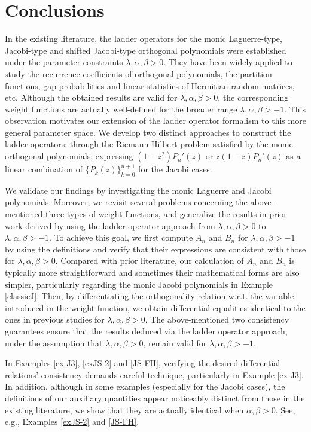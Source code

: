 \documentclass[12pt,a4paper]{article}    %
\numberwithin{equation}{section}
\begin{document}
\section{Conclusions}
\sloppy
In the existing literature, the ladder operators for the monic Laguerre-type, Jacobi-type and shifted Jacobi-type orthogonal polynomials were established under the parameter constraints $\lambda,\alpha,\beta>0$. They have been widely applied to study the recurrence coefficients of orthogonal polynomials, the partition functions, gap probabilities and linear statistics of Hermitian random matrices, etc. Although the obtained results are valid for $\lambda,\alpha,\beta>0$, the corresponding weight functions are actually well-defined for the broader range $\lambda,\alpha,\beta>-1$. This observation motivates our extension of the ladder operator formalism to this more general parameter space.
We develop two distinct approaches to construct the ladder operators: through the Riemann-Hilbert problem satisfied by the monic orthogonal polynomials; expressing $(1-z^2)P_n'(z)$ or $z(1-z)P_n'(z)$ as a linear combination of $\{P_k(z)\}_{k=0}^{n+1}$ for the Jacobi cases.

We validate our findings by investigating the monic Laguerre and Jacobi polynomials.
Moreover, we revisit several problems concerning the above-mentioned three types of weight functions, and generalize the results in prior work derived by using the ladder operator approach from $\lambda,\alpha,\beta>0$ to $\lambda,\alpha,\beta>-1$. To achieve this goal, we first compute $A_n$ and $B_n$ for $\lambda,\alpha,\beta>-1$ by using the definitions and verify that their expressions are consistent with those for $\lambda,\alpha,\beta>0$. Compared with prior literature, our calculation of $A_n$ and $B_n$ is typically more straightforward and sometimes their mathematical forms are also simpler, particularly regarding the monic Jacobi polynomials in Example \ref{classicJ}. Then, by differentiating the orthogonality relation w.r.t. the variable introduced in the weight function, we obtain differential equalities identical to the ones in previous studies for $\lambda,\alpha,\beta>0$. The above-mentioned two consistency guarantees ensure that the results deduced via the ladder operator approach, under the assumption that $\lambda,\alpha,\beta>0$, remain valid for $\lambda,\alpha,\beta>-1$.

In Examples \ref{ex-J3}, \ref{exJS-2} and \ref{JS-FH}, verifying the desired differential relations' consistency demands careful technique, particularly in Example \ref{ex-J3}. In addition, although in some examples (especially for the Jacobi cases), the definitions of our auxiliary quantities appear noticeably distinct from those in the existing literature, we show that they are actually identical when $\alpha,\beta>0$. See, e.g., Examples \ref{exJS-2} and \ref{JS-FH}.
\end{document}
